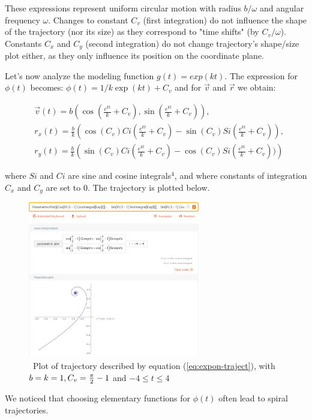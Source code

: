 \documentclass[journal]{IEEEtran}
\begin{document}
These expressions represent uniform circular motion with radius $b/\omega$ and angular frequency $\omega$.  Changes to constant $C_v$ (first integration) do not influence the shape of the trajectory (nor its size) as they correspond to "time shifts" (by $C_v / \omega$). Constants $C_x$ and $C_y$ (second integration) do not change trajectory's shape/size plot either, as they only influence its position on the coordinate plane.

Let's now analyze the modeling function $g(t)=exp(kt)$. The expression for $\phi(t)$ becomes: $\phi(t)= 1/k \exp(k t)+C_v$ and for $\vec{v}$ and $\vec{r}$ we obtain:

\begin{equation}
\begin{aligned}
&\vec{v}(t)= b \left( \cos (\frac{e^{kt}}{k}  + C_v ), \sin (\frac{e^{kt}}{k} + C_v  ) \right),\\
&r_x(t)= \frac{b}{k} \left( \cos(C_v) Ci (\frac{e^{kt}}{k}  + C_v ) - \sin (C_v) Si (\frac{e^{kt}}{k}  + C_v ) \right), \\
&r_y(t)= \frac{b}{k} \left( \sin(C_v) Ci (\frac{e^{kt}}{k}  + C_v ) - \cos (C_v) Si (\frac{e^{kt}}{k}  + C_v ))\right)
\end{aligned}
\label{eq:expon-traject}
\end{equation}

where $Si$ and $Ci$ are sine and cosine integrals$^4$, and where constants of integration $C_x$ and $C_y$ are set to $0$. The trajectory is plotted below.
\begin{figure}[H]
\includegraphics[width=7.5cm]{FIG1_1}
\caption{\ Plot of trajectory described by equation (\ref{eq:expon-traject}), with $b=k=1, C_v={\pi\over 2} -1$ and $ -4 \leq t \leq 4 $ \bigskip}
\centering
\label{fig:phiexp-traj}
\end{figure} 
We noticed that choosing elementary functions for $\phi(t)$ often lead to spiral trajectories.
\end{document}
